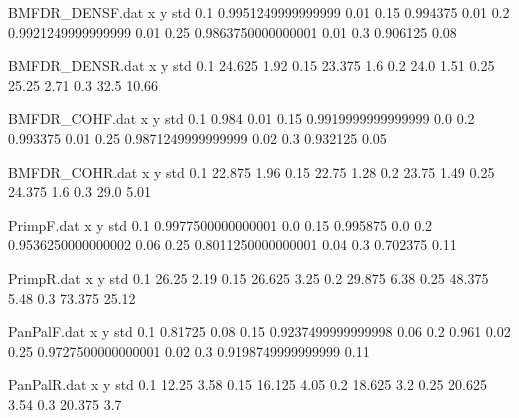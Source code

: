 \begin{filecontents}{BMFDR_DENSF.dat}
x y std
0.1 0.9951249999999999 0.01
0.15 0.994375 0.01
0.2 0.9921249999999999 0.01
0.25 0.9863750000000001 0.01
0.3 0.906125 0.08
\end{filecontents}
\begin{filecontents}{BMFDR_DENSR.dat}
x y std
0.1 24.625 1.92
0.15 23.375 1.6
0.2 24.0 1.51
0.25 25.25 2.71
0.3 32.5 10.66
\end{filecontents}
\begin{filecontents}{BMFDR_COHF.dat}
x y std
0.1 0.984 0.01
0.15 0.9919999999999999 0.0
0.2 0.993375 0.01
0.25 0.9871249999999999 0.02
0.3 0.932125 0.05
\end{filecontents}
\begin{filecontents}{BMFDR_COHR.dat}
x y std
0.1 22.875 1.96
0.15 22.75 1.28
0.2 23.75 1.49
0.25 24.375 1.6
0.3 29.0 5.01
\end{filecontents}
\begin{filecontents}{PrimpF.dat}
x y std
0.1 0.9977500000000001 0.0
0.15 0.995875 0.0
0.2 0.9536250000000002 0.06
0.25 0.8011250000000001 0.04
0.3 0.702375 0.11
\end{filecontents}
\begin{filecontents}{PrimpR.dat}
x y std
0.1 26.25 2.19
0.15 26.625 3.25
0.2 29.875 6.38
0.25 48.375 5.48
0.3 73.375 25.12
\end{filecontents}
\begin{filecontents}{PanPalF.dat}
x y std
0.1 0.81725 0.08
0.15 0.9237499999999998 0.06
0.2 0.961 0.02
0.25 0.9727500000000001 0.02
0.3 0.9198749999999999 0.11
\end{filecontents}
\begin{filecontents}{PanPalR.dat}
x y std
0.1 12.25 3.58
0.15 16.125 4.05
0.2 18.625 3.2
0.25 20.625 3.54
0.3 20.375 3.7
\end{filecontents}

